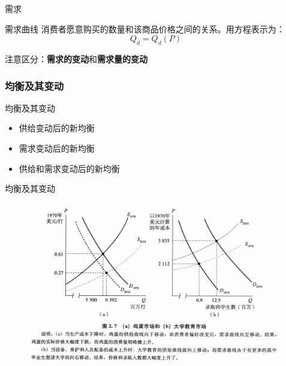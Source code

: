 \documentclass[UTF8]{ctexbeamer}
\begin{document}
\begin{frame}{需求}
\begin{block}{需求曲线}
消费者愿意购买的数量和该商品价格之间的关系。\newline 用方程表示为：
\begin{equation*}
Q_d = Q_d(P)
\end{equation*}
\end{block}
注意区分：\textbf{需求的变动}和\textbf{需求量的变动}
\end{frame}

\subsubsection{均衡及其变动}
\begin{frame}{均衡及其变动}
\linespread{1.5}
\begin{itemize}
\item 供给变动后的新均衡
\item 需求变动后的新均衡
\item 供给和需求变动后的新均衡
\end{itemize}
\end{frame}

\begin{frame}{均衡及其变动}
\begin{figure}
\centering
\includegraphics[width=110mm]{figures/2_1.png}
\end{figure}
\end{frame}
\end{document}
